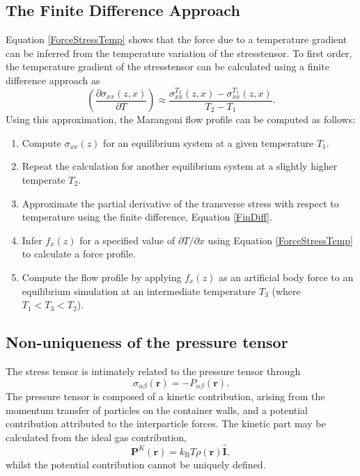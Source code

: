 \subsection{The Finite Difference Approach}
Equation \ref{ForceStressTemp} shows that the force due to a temperature gradient can be inferred from the temperature variation of the stresstensor. 
To first order, the temperature gradient of the stresstensor can be calculated using a finite difference approach as
\begin{equation}
\label{FinDiff}
\left( \frac{\partial \sigma_{xx}(z,x)}{\partial T} \right) \approx \frac{\sigma_{xx}^{T_{2}}(z,x) - \sigma_{xx}^{T_{1}}(z,x)}{T_{2} - T_{1}}.
\end{equation}
Using this approximation, the Marangoni flow profile can be computed as follows:
\begin{enumerate}
	\item Compute $\sigma_{xx}(z)$ for an equilibrium system at a given temperature $T_{1}$.
	\item Repeat the calculation for another equilibrium system at a slightly higher temperate $T_{2}$.
	\item Approximate the partial derivative of the transverse stress with respect to temperature using the finite difference, Equation \ref{FinDiff}.
	\item Infer $f_{x}(z)$ for a specified value of $\partial T / \partial x$ using Equation \ref{ForceStressTemp} to calculate a force profile.
	\item Compute the flow profile by applying $f_{x}(z)$ as an artificial body force to an equilibrium simulation at an intermediate temperature $T_{3}$ (where $T_{1} < T_{3} < T_{2}$).
\end{enumerate}

\subsection{Non-uniqueness of the pressure tensor}
The stress tensor is intimately related to the pressure tensor through
\begin{equation}
\sigma_{\alpha \beta}(\mathbf{r}) = - P_{\alpha \beta} (\mathbf{r}).
\end{equation}
The pressure tensor is composed of a kinetic contribution, arising from the momentum transfer of particles on the container walls, and a potential contribution attributed to the interparticle forces.\cite{VarnikBinder}
The kinetic part may be calculated from the ideal gas contribution,
\begin{equation}
\mathbf{P}^{K}(\mathbf{r})=k_{\mathrm{B}} T \rho(\mathbf{r}) \hat{\mathbf{I}},
\end{equation}
whilst the potential contribution cannot be uniquely defined.

